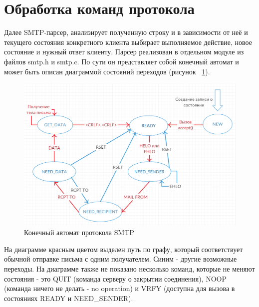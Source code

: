 \documentclass[a4paper,12pt]{report}
\begin{document}

\section{Обработка команд протокола}

Далее SMTP-парсер, анализирует полученную строку и в зависимости от неё и текущего состояния конкретного клиента выбирает выполняемое действие, новое состояние и нужный ответ клиенту. Парсер реализован в отдельном модуле из файлов smtp.h и smtp.c. По сути он представляет собой конечный автомат и может быть описан диаграммой состояний переходов (рисунок ~\ref{fig:smtp_fsm}).

\begin{figure}
\centering
\includegraphics[width=\textwidth]{diagramms/smtp_fsm.png}
\caption{Конечный автомат протокола SMTP}
\label{fig:smtp_fsm}
\end{figure}

На диаграмме красным цветом выделен путь по графу, который соответствует обычной отправке письма с одним получателем. Синим - другие возможные переходы. На диаграмме также не показано несколько команд, которые не меняют состояния - это QUIT (команда серверу о закрытии соединения), NOOP (команда ничего не делать - no operation) и VRFY (доступна для вызова в состояниях READY и NEED_SENDER).
\end{document}
